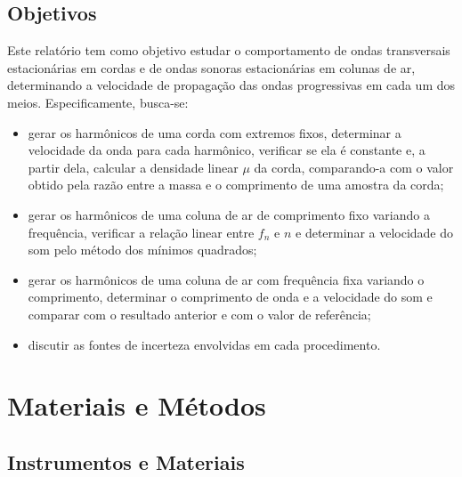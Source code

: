 \documentclass[12pt, a4paper]{article}
\begin{document}
\subsection{Objetivos}

Este relatório tem como objetivo estudar o comportamento de ondas transversais estacionárias em cordas e de ondas sonoras estacionárias em colunas de ar, determinando a velocidade de propagação das ondas progressivas em cada um dos meios. Especificamente, busca-se:
\begin{itemize}
    \item gerar os harmônicos de uma corda com extremos fixos, determinar a velocidade da onda para cada harmônico, verificar se ela é constante e, a partir dela, calcular a densidade linear $\mu$ da corda, comparando-a com o valor obtido pela razão entre a massa e o comprimento de uma amostra da corda;
    \item gerar os harmônicos de uma coluna de ar de comprimento fixo variando a frequência, verificar a relação linear entre $f_n$ e $n$ e determinar a velocidade do som pelo método dos mínimos quadrados;
    \item gerar os harmônicos de uma coluna de ar com frequência fixa variando o comprimento, determinar o comprimento de onda e a velocidade do som e comparar com o resultado anterior e com o valor de referência;
    \item discutir as fontes de incerteza envolvidas em cada procedimento.
\end{itemize}

\section{Materiais e Métodos}

\subsection{Instrumentos e Materiais}
\end{document}

